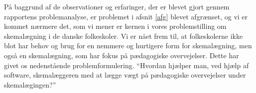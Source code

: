 På baggrund af de observationer og erfaringer, der er blevet gjort gennem rapportens problemanalyse, er problemet i afsnit \ref{afg} blevet afgrænset, og vi er kommet nærmere det, som vi mener er kernen i vores problemstilling om skemalægning i de danske folkeskoler. Vi er nået frem til, at folkeskolerne ikke blot har behov og brug for en nemmere og hurtigere form for skemalægning, men også en skemalægning, som har fokus på pædagogiske overvejelser. Dette har givet os nedenstående problemformulering. \newline\newline
``Hvordan hjælper man, ved hjælp af software, skemalæggeren med at lægge vægt på pædagogiske overvejelser under skemalægingen?''

